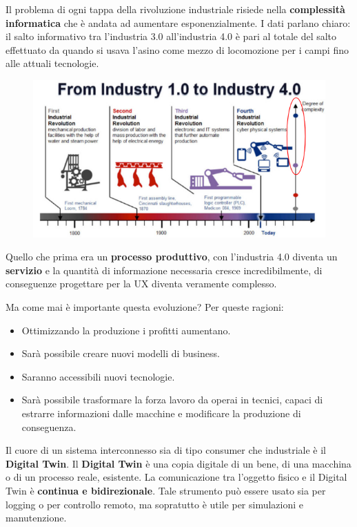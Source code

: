 \documentclass[a4paper,11pt,oneside]{book}
\begin{document}
\pagebreak

Il problema di ogni tappa della rivoluzione industriale risiede nella \textbf{complessità informatica} che è andata ad aumentare esponenzialmente. I dati parlano chiaro: il salto informativo tra l'industria 3.0 all'industria 4.0 è pari al totale del salto effettuato da quando si usava l'asino come mezzo di
locomozione per i campi fino alle attuali tecnologie.

\begin{figure}[!h]
	\centering
	\includegraphics[scale=0.6]{immagini/Revolution.png}
\end{figure}

Quello che prima era un \textbf{processo produttivo}, con l'industria 4.0 diventa un \textbf{servizio} e la quantità di informazione necessaria cresce incredibilmente, di conseguenze progettare per la UX diventa veramente complesso.

Ma come mai è importante questa evoluzione? Per queste ragioni:

\begin{itemize}
	\item  Ottimizzando la produzione i profitti aumentano.
	\item Sarà possibile creare nuovi modelli di business.
	\item Saranno accessibili nuovi tecnologie.
	\item Sarà possibile trasformare la forza lavoro da operai in tecnici, capaci di estrarre informazioni dalle macchine e modificare la produzione di conseguenza.
\end{itemize}

Il cuore di un sistema interconnesso sia di tipo consumer che industriale è il
\textbf{Digital Twin}. Il \textbf{Digital Twin} è  una copia digitale di un bene, di una macchina o di un processo reale, esistente. La comunicazione tra l'oggetto fisico e il Digital Twin è \textbf{continua e bidirezionale}. Tale strumento può essere usato sia per logging o per controllo remoto, ma sopratutto è utile per simulazioni e manutenzione.
\end{document}
